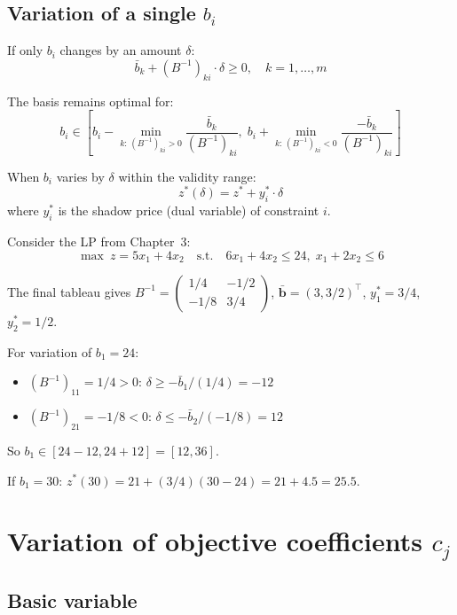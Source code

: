 \subsection{Variation of a single $b_i$}

If only $b_i$ changes by an amount $\delta$:
\[
  \bar{b}_k + (B^{-1})_{ki} \cdot \delta \ge 0, \quad k = 1, \ldots, m
\]

\begin{keyformulas}[title=\textbf{Validity range for $b_i$}]
The basis remains optimal for:
\[
  b_i \in \left[
    b_i - \min_{k:\, (B^{-1})_{ki}>0} \frac{\bar{b}_k}{(B^{-1})_{ki}},\;
    b_i + \min_{k:\, (B^{-1})_{ki}<0} \frac{-\bar{b}_k}{(B^{-1})_{ki}}
  \right]
\]
\end{keyformulas}

\begin{theorem}[Variation of $z^*$]
When $b_i$ varies by $\delta$ within the validity range:
\[
  z^*(\delta) = z^* + y_i^* \cdot \delta
\]
where $y_i^*$ is the shadow price (dual variable) of constraint $i$.
\end{theorem}

\begin{example}[Variation of $b_1$]
Consider the LP from Chapter~3:
\[
\max\ z = 5x_1 + 4x_2 \quad \text{s.t.} \quad
6x_1 + 4x_2 \le 24,\; x_1 + 2x_2 \le 6
\]

The final tableau gives $B^{-1} = \begin{pmatrix} 1/4 & -1/2 \\
-1/8 & 3/4 \end{pmatrix}$, $\bar{\mathbf{b}} = (3, 3/2)^\top$,
$y_1^* = 3/4$, $y_2^* = 1/2$.

For variation of $b_1 = 24$:
\begin{itemize}
  \item $(B^{-1})_{11} = 1/4 > 0$: $\delta \ge -\bar{b}_1/(1/4) = -12$
  \item $(B^{-1})_{21} = -1/8 < 0$: $\delta \le -\bar{b}_2/(-1/8) = 12$
\end{itemize}
So $b_1 \in [24-12, 24+12] = [12, 36]$.

If $b_1 = 30$: $z^*(30) = 21 + (3/4)(30-24) = 21 + 4.5 = 25.5$.
\end{example}

\section{Variation of objective coefficients $c_j$}

\subsection{Basic variable}

